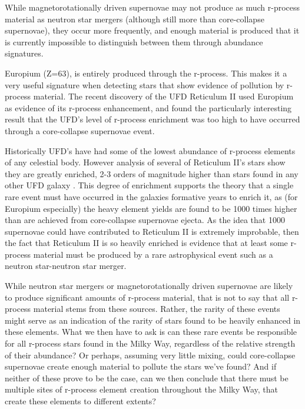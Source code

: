\documentclass[a4paper,fleqn,usenatbib]{mnras}
\begin{document}
	While magnetorotationally driven supernovae may not produce as much r-process material as neutron star mergers (although still more than core-collapse supernovae), they occur more frequently, and enough material is produced that it is currently impossible to distinguish between them through abundance signatures.
	
	Europium (Z=63), is entirely produced through the r-process. This makes it a very useful signature when detecting stars that show evidence of pollution by r-process material. The recent discovery of the UFD Reticulum II used Europium as evidence of its r-process enhancement, and found the particularly interesting result that the UFD's level of r-process enrichment was too high to have occurred through a core-collapse supernovae event.

	Historically UFD's have had some of the lowest abundance of r-process elements of any celestial body. However analysis of several of Reticulum II's stars show they are greatly enriched, 2-3 orders of magnitude higher than stars found in any other UFD galaxy \citep{Ji2016}. This degree of enrichment supports the theory that a single rare event must have occurred in the galaxies formative years to enrich it, as (for Europium especially) the heavy element yields are found to be 1000 times higher than are achieved from core-collapse supernovae ejecta. As the idea that 1000 supernovae could have contributed to Reticulum II is extremely improbable, then the fact that Reticulum II is so heavily enriched is evidence that at least some r-process material must be produced by a rare astrophysical event such as a neutron star-neutron star merger.
	
	While neutron star mergers or magnetorotationally driven supernovae are likely to produce significant amounts of r-process material, that is not to say that all r-process material stems from these sources. Rather, the rarity of these events might serve as an indication of the rarity of stars found to be heavily enhanced in these elements. What we then have to ask is can these rare events be responsible for all r-process stars found in the Milky Way, regardless of the relative strength of their abundance? Or perhaps, assuming very little mixing, could core-collapse supernovae create enough material to pollute the stars we've found? And if neither of these prove to be the case, can we then conclude that there must be multiple sites of r-process element creation throughout the Milky Way, that create these elements to different extents?
	
\end{document}
